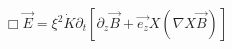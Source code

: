 \begin{equation}
{\Box}\vec{E}={\xi}^{2}\dot{K}{\partial}_{t}[{\partial}_{z}{\vec{B}}+\vec{e_{z}}X({\nabla}X\vec{B})]
\label{30}
\end{equation}

